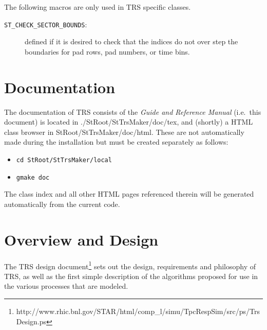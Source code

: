 \documentclass[twoside]{article}
\newcommand{\name}[1]{\textsf{#1}}%
\newcommand{\comp}[1]{\texttt{#1}}%
\begin{document}
The following macros are only used in TRS specific classes.

\begin{description}
  \item[\comp{ST\_CHECK\_SECTOR\_BOUNDS}:] defined if it is desired to
    check that the indices do not over step the boundaries for pad rows,
    pad numbers, or time bins.
\end{description}


\section{Documentation}   

The documentation of \name{TRS} consists of the {\em \bfUser Guide and
    Reference Manual} (i.e.~this document) is 
located in \name{./StRoot/StTrsMaker/doc/tex}, and (shortly) 
a \name{HTML} class browser in
\name{StRoot/StTrsMaker/doc/html}.
These are not automatically made during the
installation but must be created separately as follows:
\begin{itemize}
  \item \comp{cd StRoot/StTrsMaker/local}
  \item \comp{gmake doc}
\end{itemize}

The class index and all other \name{HTML} pages referenced therein 
will be generated automatically from the current code. 

\section{Overview and Design}  
\label{sec:design}

The \name{TRS} design document\footnote{http://www.rhic.bnl.gov/STAR/html/comp\_l/simu/TpcRespSim/src/ps/TrsDesign.ps} 
sets out the design, requirements and philosophy of \name{TRS}, as well as
the first simple description of the algorithms proposed for use in
the various processes that are modeled.
\end{document}
